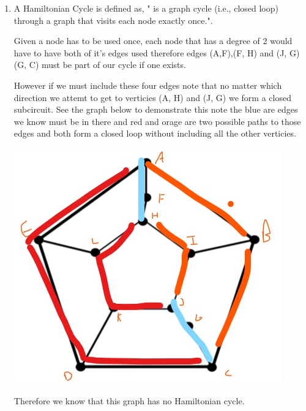 \documentclass{article}
\begin{document}
\begin{enumerate}
\begin{enumerate}
        \item A Hamiltonian Cycle is defined as, " is a graph cycle (i.e., closed loop) through a graph that visits each node exactly once.".
        
        Given a node has to be used once, each node that has a degree of 2 would have to have both of it's edges used therefore edges (A,F),(F, H) and (J, G)(G, C) must be part of our cycle if one exists. 
        
        However if we must include these four edges note that no matter which direction we attemt to get to verticies (A, H) and (J, G) we form a closed subcircuit. 
        See the graph below to demonstrate this note the blue are edges we know must be in there and red and orage are two possible paths to those edges and both form a closed loop without including all the other verticies.

        \includegraphics[scale=0.3]{1_Graph2.jpg}

        Therefore we know that this graph has no Hamiltonian cycle.


\end{enumerate}
\end{enumerate}
\end{document}
